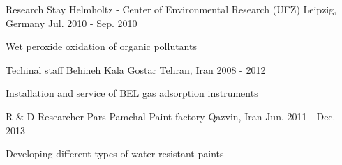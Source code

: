\begin{cventries}
    \cventry
    {Research Stay} %
    {Helmholtz - Center of Environmental Research (UFZ)} %
    {Leipzig, Germany} %
    {Jul. 2010 - Sep. 2010} %
    {
      \begin{cvitems} %
        \item {Wet peroxide oxidation of organic pollutants}
      \end{cvitems}
    }    


  \cventry
    {Techinal staff} %
    {Behineh Kala Gostar} %
    {Tehran, Iran} %
    {2008 - 2012} %
    {
      \begin{cvitems} %
        \item {Installation and service of BEL gas adsorption instruments}
      \end{cvitems}
    }
    
     \cventry
        {R \& D Researcher} %
        {Pars Pamchal Paint factory} %
        {Qazvin, Iran} %
        {Jun. 2011 - Dec. 2013} %
        {
          \begin{cvitems} %
            \item {Developing different types of water resistant paints}
          \end{cvitems}
        }
    
    


\end{cventries}
